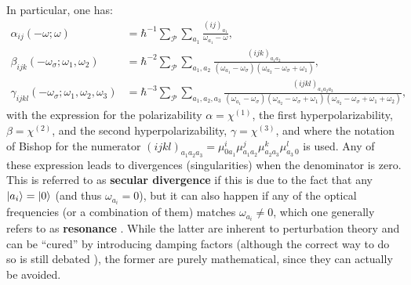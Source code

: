 \documentclass[12pt,a4paper]{article}
\begin{document}
	In particular, one has:\begin{align*}
		\alpha_{ij}(-\omega;\omega) &= \hbar^{-1}\sum_\mathcal{P} \sum_{a_1} \frac{(ij)_{a_1}}{\omega_{a_1}-\omega},\\
		\beta_{ijk}(-\omega_\sigma;\omega_1,\omega_2) &= \hbar^{-2}\sum_\mathcal{P} \sum_{a_1,a_2} \frac{(ijk)_{a_1a_2}}{(\omega_{a_1}-\omega_\sigma)(\omega_{a_2}-\omega_\sigma+\omega_1)},\\
		\gamma_{ijkl}(-\omega_\sigma;\omega_1,\omega_2,\omega_3) &= \hbar^{-3}\sum_\mathcal{P} \sum_{a_1,a_2,a_3} \frac{(ijkl)_{a_1a_2a_3}}{(\omega_{a_1}-\omega_\sigma)(\omega_{a_2}-\omega_\sigma+\omega_1)(\omega_{a_2}-\omega_\sigma+\omega_1+\omega_2)},
	\end{align*}
	with the expression for the polarizability $\alpha = \chi^{(1)}$, the first hyperpolarizability, $\beta = \chi^{(2)}$, and the second hyperpolarizability, $\gamma = \chi^{(3)}$, and where the notation of Bishop \cite{bishopExplicitNondivergentFormulas1994} for the numerator $(ijkl)_{a_1a_2a_3} = \mu_{0a_1}^i\mu_{a_1a_2}^j\mu_{a_2a_3}^k\mu_{a_3\,0}^l$ is used. Any of these expression leads to divergences (singularities) when the denominator is zero. This is referred to as \textbf{secular divergence} if this is due to the fact that any $\ket{a_i} = \ket{0}$  (and thus $\omega_{a_i} = 0$), but it can also happen if any of the optical frequencies (or a combination of them) matches $\omega_{a_i}\neq 0$, which one generally refers to as \textbf{resonance} \cite{bishopExplicitNondivergentFormulas1994}. While the latter are inherent to perturbation theory and can be ``cured'' by introducing damping factors (although the correct way to do so is still debated \cite{campoPracticalModelFirst2012a}), the former are purely mathematical, since they can actually be avoided.
	
	
	
	
\end{document}
